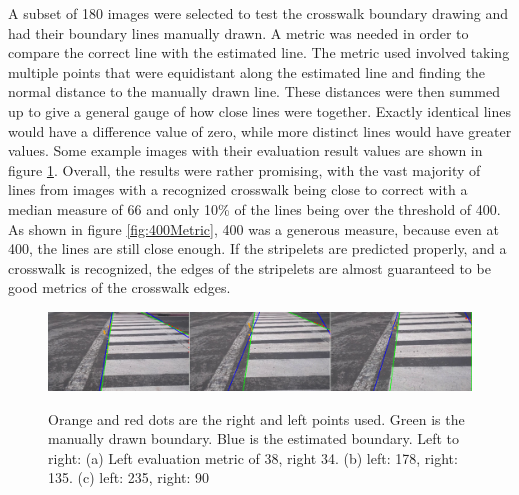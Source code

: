 \documentclass[12pt]{ucthesis}
\newcommand{\captionfonts}{\small\bf\ssp}
\begin{document}
A subset of 180 images were selected to test the crosswalk boundary drawing and had their boundary lines manually drawn. A metric was needed in order to compare the correct line with the estimated line. The metric used involved taking multiple points that were equidistant along the estimated line and finding the normal distance to the manually drawn line. These distances were then summed up to give a general gauge of how close lines were together. Exactly identical lines would have a difference value of zero, while more distinct lines would have greater values. Some example images with their evaluation result values are shown in figure \ref{fig:LinesUsingJustGoodStartAndEnds2}. Overall, the results were rather promising, with the vast majority of lines from images with a recognized crosswalk being close to correct with a median measure of 66 and only 10\% of the lines being over the threshold of 400. As shown in figure \ref{fig:400Metric}, 400 was a generous measure, because even at 400, the lines are still close enough.  If the stripelets are predicted properly, and a crosswalk is recognized, the edges of the stripelets are almost guaranteed to be good metrics of the crosswalk edges.

\begin{figure}[H]
\begin{center}
\includegraphics[width=15cm]{LinesUsingJustGoodStartAndEnds2.png}
\captionfonts
\caption[Boundary Line Estimation Results]{Orange and red dots are the right and left points used. Green is the manually drawn boundary. Blue is the estimated boundary. Left to right: (a) Left evaluation metric of 38, right 34. (b) left: 178, right: 135. (c) left: 235, right: 90}
\label{fig:LinesUsingJustGoodStartAndEnds2}
\end{center}
\end{figure}
\end{document}
